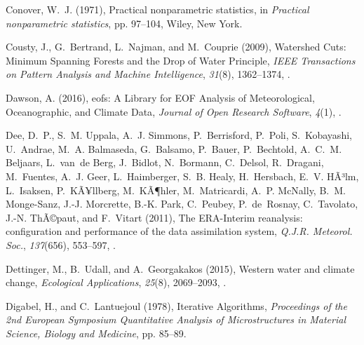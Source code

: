 \documentclass[final, double]{ua-thesis}
\begin{document}
\begin{thebibliography}{}
Conover, W.~J. (1971), Practical nonparametric statistics, in \textit{Practical
  nonparametric statistics}, pp. 97--104, Wiley, New York.

Cousty, J., G.~Bertrand, L.~Najman, and M.~Couprie (2009), Watershed {Cuts}:
  {Minimum} {Spanning} {Forests} and the {Drop} of {Water} {Principle},
  \textit{IEEE Transactions on Pattern Analysis and Machine Intelligence},
  \textit{31}(8), 1362--1374, .

Dawson, A. (2016), eofs: {A} {Library} for {EOF} {Analysis} of
  {Meteorological}, {Oceanographic}, and {Climate} {Data}, \textit{Journal of
  Open Research Software}, \textit{4}(1), .

Dee, D.~P., S.~M. Uppala, A.~J. Simmons, P.~Berrisford, P.~Poli, S.~Kobayashi,
  U.~Andrae, M.~A. Balmaseda, G.~Balsamo, P.~Bauer, P.~Bechtold, A.~C.~M.
  Beljaars, L.~van~de Berg, J.~Bidlot, N.~Bormann, C.~Delsol, R.~Dragani,
  M.~Fuentes, A.~J. Geer, L.~Haimberger, S.~B. Healy, H.~Hersbach, E.~V. HÃ³lm,
  L.~Isaksen, P.~KÃ¥llberg, M.~KÃ¶hler, M.~Matricardi, A.~P. McNally, B.~M.
  Monge-Sanz, J.-J. Morcrette, B.-K. Park, C.~Peubey, P.~de~Rosnay,
  C.~Tavolato, J.-N. ThÃ©paut, and F.~Vitart (2011), The {ERA}-{Interim}
  reanalysis: configuration and performance of the data assimilation system,
  \textit{Q.J.R. Meteorol. Soc.}, \textit{137}(656), 553--597,
  .

Dettinger, M., B.~Udall, and A.~Georgakakos (2015), Western water and climate
  change, \textit{Ecological Applications}, \textit{25}(8), 2069--2093,
  .

Digabel, H., and C.~Lantuejoul (1978), Iterative {Algorithms},
  \textit{Proceedings of the 2nd European Symposium Quantitative Analysis of
  Microstructures in Material Science, Biology and Medicine}, pp. 85--89.


\end{thebibliography}
\end{document}
